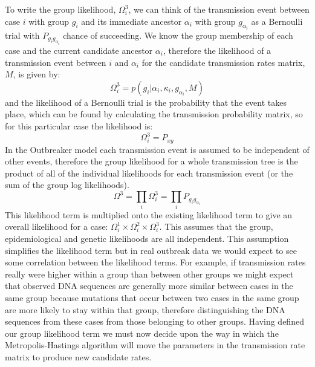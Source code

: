 \documentclass[11pt,a4paper]{report}
\begin{document}
To write the group likelihood, $\Omega^{3}_i$, we can think of the transmission event between case $i$ with group $g_i$ and its immediate ancestor $\alpha_i$ with group $g_{\alpha_{i}}$ as a Bernoulli trial with $P_{g_i g_{\alpha_{i}}}$ chance of succeeding. We know the group membership of each case and the current candidate ancestor $\alpha_i$, therefore the likelihood of a transmission event between $i$ and $\alpha_i$ for the candidate transmission rates matrix, $M$, is given by:
\[ \Omega_i^3 = p(g_i | \alpha_i, \kappa_i, g_{\alpha_i}, M) \]
and the likelihood of a Bernoulli trial is the probability that the event takes place, which can be found by calculating the transmission probability matrix, so for this particular case the likelihood is:
\[ \Omega_i^3 = P_{xy} \]
In the Outbreaker model each transmission event is assumed to be independent of other events, therefore the group likelihood for a whole transmission tree is the product of all of the individual likelihoods for each transmission event (or the sum of the group log likelihoods).
\[ \Omega^3 = \prod_i{\Omega_i^3} = \prod_i{P_{g_i g_{\alpha_i}}} \]
This likelihood term is multiplied onto the existing likelihood term to give an overall likelihood for a case: $\Omega_i^1 \times \Omega_i^2 \times \Omega_i^3$. This assumes that the group, epidemiological and genetic likelihoods are all independent. This assumption simplifies the likelihood term but in real outbreak data we would expect to see some correlation between the likelihood terms. For example, if transmission rates really were higher within a group than between other groups we might expect that observed DNA sequences are generally more similar between cases in the same group because mutations that occur between two cases in the same group are more likely to stay within that group, therefore distinguishing the DNA sequences from these cases from those belonging to other groups. Having defined our group likelihood term we must now decide upon the way in which the Metropolis-Hastings algorithm will move the parameters in the transmission rate matrix to produce new candidate rates.
\end{document}
